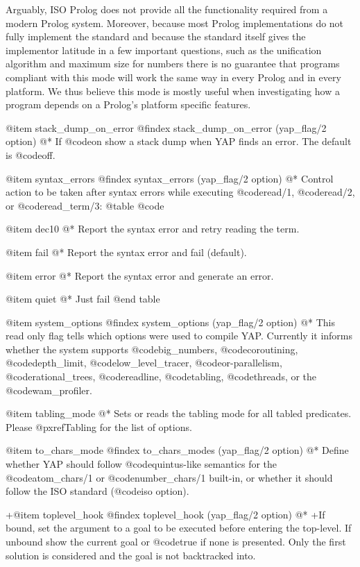 {{{{{{{{{Arguably, ISO Prolog does not provide all the functionality required
from a modern Prolog system. Moreover, because most Prolog
implementations do not fully implement the standard and because the
standard itself gives the implementor latitude in a few important
questions, such as the unification algorithm and maximum size for
numbers there is no guarantee that programs compliant with this mode
will work the same way in every Prolog and in every platform. We thus
believe this mode is mostly useful when investigating how a program
depends on a Prolog's platform specific features.

@item  stack_dump_on_error
@findex stack_dump_on_error (yap_flag/2 option)
@*
If @code{on} show a stack dump when YAP finds an error. The default is
@code{off}.

@item  syntax_errors
@findex syntax_errors (yap_flag/2 option)
@*
Control action to be taken after syntax errors while executing @code{read/1},
@code{read/2}, or @code{read_term/3}:
@table @code

@item dec10
@*
Report the syntax error and retry reading the term.
 
@item fail
@*
Report the syntax error and fail (default).

@item error
@*
Report the syntax error and generate an error.

@item quiet
@*
Just fail
@end table

@item system_options
@findex system_options (yap_flag/2 option)
@* This read only flag tells which options were used to compile
YAP. Currently it informs whether the system supports @code{big_numbers},
@code{coroutining}, @code{depth_limit}, @code{low_level_tracer},
@code{or-parallelism}, @code{rational_trees}, @code{readline}, @code{tabling},
@code{threads}, or the @code{wam_profiler}.

@item tabling_mode
@* Sets or reads the tabling mode for all tabled predicates. Please
@pxref{Tabling} for the list of options.

@item to_chars_mode
@findex to_chars_modes (yap_flag/2 option)
@* Define whether YAP should follow @code{quintus}-like
semantics for the @code{atom_chars/1} or @code{number_chars/1} built-in,
or whether it should follow the ISO standard (@code{iso} option).

+@item toplevel_hook
@findex toplevel_hook (yap_flag/2 option)
@*
+If bound, set the argument to a goal to be executed before entering the
top-level. If unbound show the current goal or @code{true} if none is
presented. Only the first solution is considered and the goal is not
backtracked into.

}}}}}}}}}
